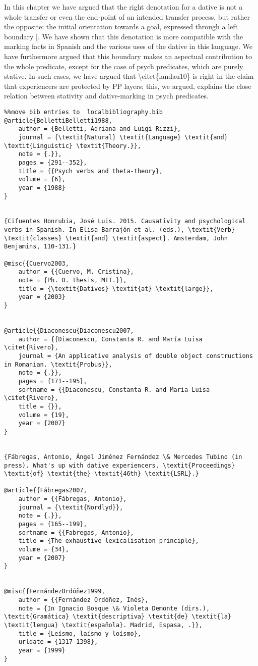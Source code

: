 \documentclass[output=paper,modfonts,nonflat]{langsci/langscibook}
\begin{document}
In this chapter we have argued that the right denotation for a dative is not a whole transfer or even the end-point of an intended transfer process, but rather the opposite: the initial orientation towards a goal, expressed through a left boundary [. We have shown that this denotation is more compatible with the marking facts in Spanish and the various uses of the dative in this language. We have furthermore argued that this boundary makes an aspectual contribution to the whole predicate, except for the case of psych predicates, which are purely stative. In such cases, we have argued that {\textbackslash}citet\{landau10\} is right in the claim that experiencers are protected by PP layers; this, we argued, explains the close relation between stativity and dative-marking in psych predicates.
\begin{verbatim}%%move bib entries to  localbibliography.bib
@article{BellettiBelletti1988,
	author = {Belletti, Adriana and Luigi Rizzi},
	journal = {\textit{Natural} \textit{Language} \textit{and} \textit{Linguistic} \textit{Theory.}},
	note = {.}},
	pages = {291--352},
	title = {{Psych verbs and theta-theory},
	volume = {6},
	year = {1988}
}


{Cifuentes Honrubia, José Luis. 2015. Causativity and psychological verbs in Spanish. In Elisa Barrajón et al. (eds.), \textit{Verb} \textit{classes} \textit{and} \textit{aspect}. Amsterdam, John Benjamins, 110-131.}

@misc{{Cuervo2003,
	author = {{Cuervo, M. Cristina},
	note = {Ph. D. thesis, MIT.}},
	title = {\textit{Datives} \textit{at} \textit{large}},
	year = {2003}
}


@article{{Diaconescu{Diaconescu2007,
	author = {{Diaconescu, Constanta R. and María Luisa \citet{Rivero},
	journal = {An applicative analysis of double object constructions in Romanian. \textit{Probus}},
	note = {.}},
	pages = {171--195},
	sortname = {{Diaconescu, Constanta R. and Maria Luisa \citet{Rivero},
	title = {}},
	volume = {19},
	year = {2007}
}


{Fábregas, Antonio, Ángel Jiménez Fernández \& Mercedes Tubino (in press). What's up with dative experiencers. \textit{Proceedings} \textit{of} \textit{the} \textit{46th} \textit{LSRL}.}

@article{{Fábregas2007,
	author = {{Fábregas, Antonio},
	journal = {\textit{Nordlyd}},
	note = {.}},
	pages = {165--199},
	sortname = {{Fabregas, Antonio},
	title = {The exhaustive lexicalisation principle},
	volume = {34},
	year = {2007}
}


@misc{{FernándezOrdóñez1999,
	author = {{Fernández Ordóñez, Inés},
	note = {In Ignacio Bosque \& Violeta Demonte (dirs.), \textit{Gramática} \textit{descriptiva} \textit{de} \textit{la} \textit{lengua} \textit{española}. Madrid, Espasa, .}},
	title = {Leísmo, laísmo y loísmo},
	urldate = {1317-1398},
	year = {1999}
}



\end{verbatim}
\end{document}
